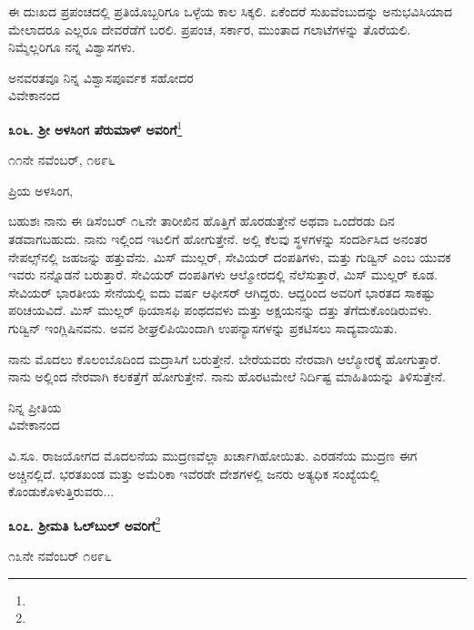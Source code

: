 ಈ ದುಃಖದ ಪ್ರಪಂಚದಲ್ಲಿ ಪ್ರತಿಯೊಬ್ಬರಿಗೂ ಒಳ್ಳೆಯ ಕಾಲ ಸಿಕ್ಕಲಿ. ಏಕೆಂದರೆ ಸುಖವೆಂಬುದನ್ನು ಅನುಭವಿಸಿಯಾದ ಮೇಲಾದರೂ ಎಲ್ಲರೂ ದೇವರೆಡೆಗೆ ಬರಲಿ. ಪ್ರಪಂಚ, ಸರ್ಕಾರ, ಮುಂತಾದ ಗಲಾಟೆಗಳನ್ನು ತೊರೆಯಲಿ. ನಿಮ್ಮೆಲ್ಲರಿಗೂ ನನ್ನ ವಿಶ್ವಾಸಗಳು.

\vspace{0.15cm}

{\flushright
ಅನವರತವೂ ನಿನ್ನ ವಿಶ್ವಾಸಪೂರ್ವಕ ಸಹೋದರ\\ವಿವೇಕಾನಂದ\par}

\newpage

\begin{center}
\textbf{೩೦೬. ಶ‍್ರೀ ಅಳಸಿಂಗ ಪೆರುಮಾಳ್ ಅವರಿಗೆ}\footnote{}
\end{center}

\begin{flushright}
೧೧ನೇ ನವೆಂಬರ್, ೧೮೯೬
\end{flushright}

\noindent
ಪ್ರಿಯ ಅಳಸಿಂಗ,

ಬಹುಶಃ ನಾನು ಈ ಡಿಸೆಂಬರ್ ೧೬ನೇ ತಾರೀಖಿನ ಹೊತ್ತಿಗೆ ಹೊರಡುತ್ತೇನೆ ಅಥವಾ ಒಂದೆರಡು ದಿನ ತಡವಾಗಬಹುದು. ನಾನು ಇಲ್ಲಿಂದ ಇಟಲಿಗೆ ಹೋಗುತ್ತೇನೆ. ಅಲ್ಲಿ ಕೆಲವು ಸ್ಥಳಗಳನ್ನು ಸಂದರ್ಶಿಸಿದ ಅನಂತರ ನೇಪಲ್ಸ್‌ನಲ್ಲಿ ಜಹಜನ್ನು ಹತ್ತುವೆನು. ಮಿಸ್ ಮುಲ್ಲರ್, ಸೇವಿಯರ್ ದಂಪತಿಗಳು, ಮತ್ತು ಗುಡ್ವಿನ್ ಎಂಬ ಯುವಕ ಇವರು ನನ್ನೊಡನೆ ಬರುತ್ತಾರೆ. ಸೇವಿಯರ್ ದಂಪತಿಗಳು ಆಲ್ಮೋರದಲ್ಲಿ ನೆಲೆಸುತ್ತಾರೆ, ಮಿಸ್ ಮುಲ್ಲರ್ ಕೂಡ. ಸೇವಿಯರ್ ಭಾರತೀಯ ಸೇನೆಯಲ್ಲಿ ಐದು ವರ್ಷ ಆಫೀಸರ್ ಆಗಿದ್ದರು. ಆದ್ದರಿಂದ ಅವರಿಗೆ ಭಾರತದ ಸಾಕಷ್ಟು ಪರಿಚಯವಿದೆ. ಮಿಸ್ ಮುಲ್ಲರ್ ಥಿಯಾಸಫಿ ಪಂಥದವಳು ಮತ್ತು ಅಕ್ಷಯನನ್ನು ದತ್ತು ತೆಗೆದುಕೊಂಡಿರುವಳು. ಗುಡ್ವಿನ್ ಇಂಗ್ಲಿಷಿನವನು. ಅವನ ಶೀಘ್ರಲಿಪಿಯಿಂದಾಗಿ ಉಪನ್ಯಾಸಗಳನ್ನು ಪ್ರಕಟಿಸಲು ಸಾದ್ಯವಾಯಿತು.

ನಾನು ಮೊದಲು ಕೊಲಂಬೊದಿಂದ ಮದ್ರಾಸಿಗೆ ಬರುತ್ತೇನೆ. ಬೇರೆಯವರು ನೇರವಾಗಿ ಆಲ್ಮೋರಕ್ಕೆ ಹೋಗುತ್ತಾರೆ. ನಾನು ಅಲ್ಲಿಂದ ನೇರವಾಗಿ ಕಲಕತ್ತೆಗೆ ಹೋಗುತ್ತೇನೆ. ನಾನು ಹೊರಟಮೇಲೆ ನಿರ್ದಿಷ್ಟ ಮಾಹಿತಿಯನ್ನು ತಿಳಿಸುತ್ತೇನೆ.

\begin{flushright}
ನಿನ್ನ ಪ್ರೀತಿಯ\\ವಿವೇಕಾನಂದ
\end{flushright}

ವಿ.ಸೂ. ರಾಜಯೋಗದ ಮೊದಲನೆಯ ಮುದ್ರಣವೆಲ್ಲಾ ಖರ್ಚಾಗಿಹೋಯಿತು. ಎರಡನೆಯ ಮುದ್ರಣ ಈಗ ಅಚ್ಚಿನಲ್ಲಿದೆ. ಭರತಖಂಡ ಮತ್ತು ಅಮೆರಿಕಾ ಇವೆರಡೇ ದೇಶಗಳಲ್ಲಿ ಜನರು ಅತ್ಯಧಿಕ ಸಂಖ್ಯೆಯಲ್ಲಿ ಕೊಂಡುಕೊಳುತ್ತಿರುವರು...

\begin{center}
\textbf{೩೦೭. ಶ‍್ರೀಮತಿ ಓಲ್‌ಬುಲ್‌ ಅವರಿಗೆ}\footnote{}
\end{center}

\begin{flushright}
೧೩ನೇ ನವೆಂಬರ್ ೧೮೯೬
\end{flushright}

